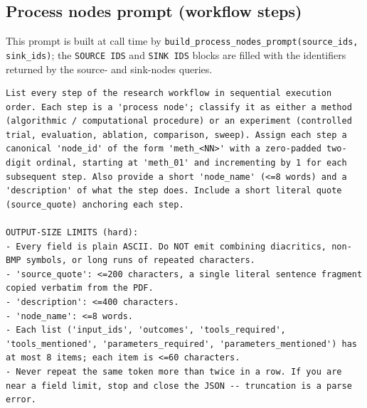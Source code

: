 \documentclass{article}
\begin{document}
\subsection{Process nodes prompt (workflow steps)}
\label{app:prompts:process-nodes}

This prompt is built at call time by
\texttt{build\_process\_nodes\_prompt(source\_ids, sink\_ids)}; the
\texttt{SOURCE IDS} and \texttt{SINK IDS} blocks are filled with the
identifiers returned by the source- and sink-nodes queries.

\begin{lstlisting}
List every step of the research workflow in sequential execution order. Each step is a 'process node'; classify it as either a method (algorithmic / computational procedure) or an experiment (controlled trial, evaluation, ablation, comparison, sweep). Assign each step a canonical 'node_id' of the form 'meth_<NN>' with a zero-padded two-digit ordinal, starting at 'meth_01' and incrementing by 1 for each subsequent step. Also provide a short 'node_name' (<=8 words) and a 'description' of what the step does. Include a short literal quote (source_quote) anchoring each step.

OUTPUT-SIZE LIMITS (hard):
- Every field is plain ASCII. Do NOT emit combining diacritics, non-BMP symbols, or long runs of repeated characters.
- 'source_quote': <=200 characters, a single literal sentence fragment copied verbatim from the PDF.
- 'description': <=400 characters.
- 'node_name': <=8 words.
- Each list ('input_ids', 'outcomes', 'tools_required', 'tools_mentioned', 'parameters_required', 'parameters_mentioned') has at most 8 items; each item is <=60 characters.
- Never repeat the same token more than twice in a row. If you are near a field limit, stop and close the JSON -- truncation is a parse error.


\end{lstlisting}
\end{document}
